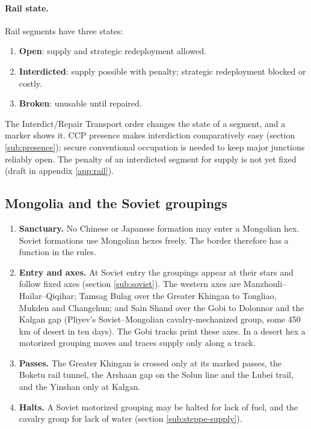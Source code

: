 \documentclass[11pt]{article}
\begin{document}
\paragraph{Rail state.} Rail segments have three states:
\begin{enumerate}
\item \textbf{Open}: supply and strategic redeployment allowed.
\item \textbf{Interdicted}: supply possible with penalty; strategic redeployment blocked or costly.
\item \textbf{Broken}: unusable until repaired.
\end{enumerate}
The Interdict/Repair Transport order changes the state of a segment, and a marker shows it. CCP presence makes interdiction comparatively easy (section \ref{sub:presence}); secure conventional occupation is needed to keep major junctions reliably open. The penalty of an interdicted segment for supply is not yet fixed (draft in appendix \ref{app:rail}).

\subsection{Mongolia and the Soviet groupings}\label{sub:mongolia-move}
\begin{enumerate}
\item \textbf{Sanctuary.} No Chinese or Japanese formation may enter a Mongolian hex. Soviet formations use Mongolian hexes freely. The border therefore has a function in the rules.
\item \textbf{Entry and axes.} At Soviet entry the groupings appear at their stars and follow fixed axes (section \ref{sub:soviet}). The western axes are Manzhouli--Hailar--Qiqihar; Tamsag Bulag over the Greater Khingan to Tongliao, Mukden and Changchun; and Sain Shand over the Gobi to Dolonnor and the Kalgan gap (Pliyev's Soviet--Mongolian cavalry-mechanized group, some 450 km of desert in ten days). The Gobi tracks print these axes. In a desert hex a motorized grouping moves and traces supply only along a track.
\item \textbf{Passes.} The Greater Khingan is crossed only at its marked passes, the Boketu rail tunnel, the Arshaan gap on the Solun line and the Lubei trail, and the Yinshan only at Kalgan.
\item \textbf{Halts.} A Soviet motorized grouping may be halted for lack of fuel, and the cavalry group for lack of water (section \ref{sub:steppe-supply}).
\end{enumerate}
\end{document}
